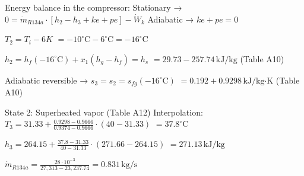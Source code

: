 Energy balance in the compressor:  
Stationary → \( 0 = \dot{m}_{R134a} \cdot [h_2 - h_3 + ke + pe] - \dot{W}_k \)  
Adiabatic → \( ke + pe = 0 \)  

\( T_2 = T_i - 6K \)  
\( = -10^\circ \text{C} - 6^\circ \text{C} = -16^\circ \text{C} \)  

\( h_2 = h_f(-16^\circ \text{C}) + x_1(h_g - h_f) = h_s \)  
\( = 29.73 - 257.74 \, \text{kJ/kg} \) (Table A10)  

Adiabatic reversible → \( s_3 = s_2 = s_{fg}(-16^\circ \text{C}) \)  
\( = 0.192 + 0.9298 \, \text{kJ/kg·K} \) (Table A10)  

State 2: Superheated vapor (Table A12)  
Interpolation:  
\( T_3 = 31.33 + \frac{0.9298 - 0.9666}{0.9374 - 0.9666} \cdot (40 - 31.33) \)  
\( = 37.8^\circ \text{C} \)  

\( h_3 = 264.15 + \frac{37.8 - 31.33}{40 - 31.33} \cdot (271.66 - 264.15) \)  
\( = 271.13 \, \text{kJ/kg} \)

\( \dot{m}_{R134a} = \frac{28 \cdot 10^{-3}}{27,313 - 23,237.74} = 0.831 \, \text{kg/s} \)